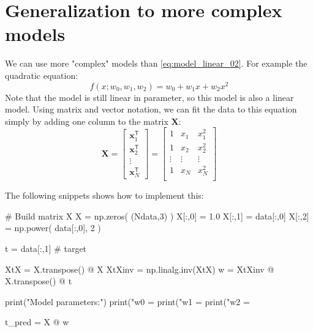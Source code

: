 \section{Generalization to more complex models}

We can use more "complex" models than \eqref{eq:model_linear_02}. For example
the quadratic equation:
\begin{equation}
f(x; w_{0}, w_{1}, w_{2}) = w_{0} + w_{1}x + w_{2}x^{2}
\label{eq:quadratic_eq}
\end{equation}
Note that the model is still linear in parameter, so this model is also a linear model.
Using matrix and vector notation, we can fit the data to this equation simply by
adding one column to the matrix $\mathbf{X}$:
\begin{equation}
\mathbf{X} = \begin{bmatrix}
\mathbf{x}^{\mathsf{T}}_{1} \\
\mathbf{x}^{\mathsf{T}}_{2} \\
\vdots \\
\mathbf{x}^{\mathsf{T}}_{N}
\end{bmatrix} =
\begin{bmatrix}
1 & x_{1} & x_{1}^{2} \\
1 & x_{2} & x_{2}^{2} \\
\vdots & \vdots & \vdots \\
1 & x_{N} & x_{N}^{2} \\
\end{bmatrix}
\end{equation}

The following snippets shows how to implement this:
\begin{pythoncode}
# Build matrix X
X = np.zeros( (Ndata,3) )
X[:,0] = 1.0
X[:,1] = data[:,0]
X[:,2] = np.power( data[:,0], 2 )
  
t = data[:,1] # target
  
XtX = X.transpose() @ X
XtXinv = np.linalg.inv(XtX)
w = XtXinv @ X.transpose() @ t

print("Model parameters:")
print("w0 = %
print("w1 = %
print("w2 = %

t_pred = X @ w
\end{pythoncode}

